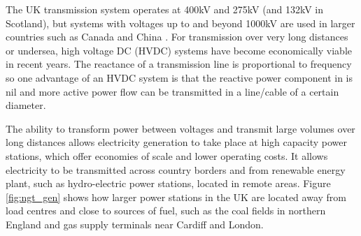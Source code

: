 The UK transmission system operates at 400kV and 275kV (and 132kV in Scotland),
but systems with voltages up to and beyond 1000kV are used in larger countries
such as Canada and China \cite{eletra:1000kV}.  For transmission over very long
distances or undersea, high voltage DC (HVDC) systems have become economically
viable in recent years.  The reactance of a transmission line is proportional to
frequency so one advantage of an HVDC system is that the reactive power
component in is nil and more active power flow can be transmitted in a
line/cable of a certain diameter.

The ability to transform power between voltages and transmit large volumes over
long distances allows electricity generation to take place at high capacity
power stations, which offer economies of scale and lower operating costs. It
allows electricity to be transmitted across country borders and from renewable
energy plant, such as hydro-electric power stations, located in remote areas.
Figure \ref{fig:ngt_gen} shows how larger power stations in the UK are located
away from load centres and close to sources of fuel, such as the coal fields
in northern England and gas supply terminals near Cardiff and London.

